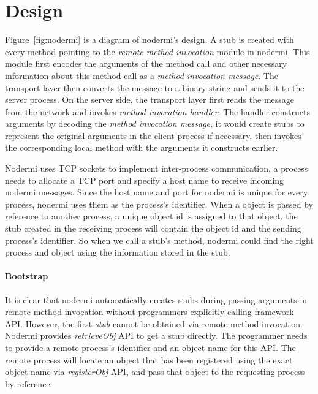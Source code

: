 \section{Design}

\nodermifig{}

Figure~\ref{fig:nodermi} is a diagram of nodermi's design.
A stub is created with every method pointing to the
\emph{remote method invocation} module in nodermi.
This module
first encodes the arguments of the method call
 and other necessary information about this method call
as a \emph{method invocation message}.
The transport layer then converts the message to
a binary string and sends it
to the server process.
On the server side, the transport layer first reads
the message from the network and invokes \emph{method invocation handler}.
The handler
constructs arguments by decoding the \emph{method invocation message},
it would create stubs to represent the original arguments in the client process
 if necessary,
then invokes the corresponding local method with the arguments
it constructs earlier.

Nodermi uses TCP sockets to implement inter-process communication,
a process needs to allocate a TCP port and specify a host name
to receive incoming nodermi messages.
Since the host name and port for nodermi is unique for every process,
nodermi uses them as the process's identifier.
When a object is passed by reference to another process,
a unique object id is assigned to that object,
the stub created in the receiving process
will contain the object id and the sending process's identifier.
So when we call a stub's method,
nodermi could find the right process and object using
the information stored in the stub.

\paragraph{Bootstrap}
It is clear that nodermi automatically creates stubs during
passing arguments in remote method invocation without programmers
explicitly calling framework API.
However, the first \emph{stub} cannot be obtained
via remote method invocation.
Nodermi provides \emph{retrieveObj} API to get
a stub directly.
The programmer needs to provide a remote process's identifier
and an object name for this API.
The remote process will locate an object that has been registered
using the exact object name via \emph{registerObj} API,
and pass that object to the requesting process by reference.


